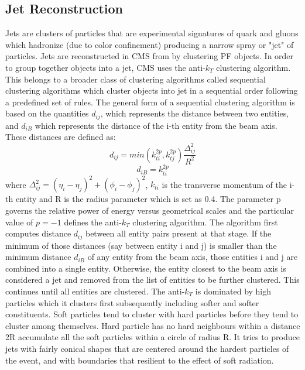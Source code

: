\subsection{Jet Reconstruction}
\label{jet_recon}
Jets are clusters of particles that are experimental signatures of quark and gluons which hadronize (due to color confinement) producing a narrow spray or "jet" of particles. Jets are reconstructed in CMS from by clustering PF objects. In order to group together objects into a jet, CMS uses the anti-$k_{T}$ clustering algorithm. This belongs to a broader class of clustering algorithms called sequential clustering algorithms which cluster objects into jet in a sequential order following a predefined set of rules. The general form of a sequential clustering algorithm is based on the quantities  $d_{ij}$, which represents the distance between two entities, and $d_{iB}$ which represents the distance of the i-th entity from the beam axis. These distances are defined as:
\begin{equation*}
  d_{ij}=min(k_{ti}^{2p},k_{tj}^{2p})\frac{\Delta_{ij}^{2}}{R^2}
\end{equation*}
\begin{equation*}
  d_{iB}=k_{ti}^{2p}
\end{equation*}
where $\Delta_{ij}^{2}=(\eta_i-\eta_j)^2+(\phi_i-\phi_j)^2$, $k_{ti}$ is the transverse momentum of the i-th entity and R is the radius parameter which is set as 0.4. The parameter p governs the relative power of energy versus geometrical scales and the particular value of $p=-1$ defines the anti-$k_{T}$ clustering algorithm. The algorithm first computes distance $d_{ij}$ between all entity pairs present at that stage. If the minimum of those distances (say between entity i and j) is smaller than the minimum distance $d_{iB}$ of any entity from the beam axis, those entities i and j are combined into a single entity. Otherwise, the entity closest to the beam axis is considered a jet and removed from the list of entities to be further clustered. This continues until all entities are clustered. The anti-$k_{T}$ is dominated by high \pt particles which it clusters first subsequently including softer and softer constituents. Soft particles tend to cluster with hard particles before they tend to cluster among themselves. Hard particle has no hard neighbours within a distance 2R accumulate all the soft particles within a circle of radius R. It tries to produce jets with fairly conical shapes that are centered around the hardest particles of the event, and with boundaries that resilient to the effect of soft radiation.

